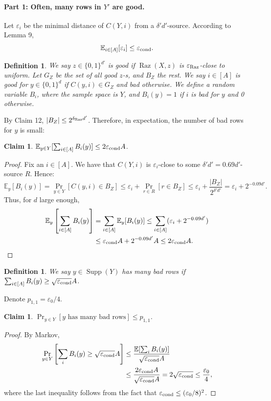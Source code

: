 \documentclass[10pt,a4paper]{article}
\newtheorem{definition}[theorem]{Definition}
\newtheorem{claim}[theorem]{Claim}
\DeclareMathOperator{\Supp}{Supp}
\DeclareMathOperator{\Raz}{Raz}
\newcommand{\E}{\mathbb E}
\begin{document}
\paragraph{Part 1: Often, many rows in $Y'$ are good.}
Let $\varepsilon_i$ be the minimal distance of $C(Y,i)$ from a $\delta'd'$-source. According to Lemma 9,
\[\E_{i\in[A]}[\varepsilon_i]\le\varepsilon_{\rm cond}.\]
\begin{definition}
We say $z\in\{0,1\}^{d'}$ is good if $\Raz(X,z)$ is $\varepsilon_{\rm Raz}$-close to uniform. Let $G_Z$ be the set of all good $z$-s, and $B_Z$ the rest. We say $i\in[A]$ is good for $y\in\{0,1\}^d$ if $C(y,i)\in G_Z$ and bad otherwise. We define a random variable $B_i$, where the sample space is $Y$, and $B_i(y)=1$ if $i$ is bad for $y$ and 0 otherwise.
\end{definition}
By Claim 12, $|B_Z|\le2^{\delta_{\rm Raz}d'}$. Therefore, in expectation, the number of bad rows for $y$ is small:
\begin{claim}$\E_{y\in Y}[\sum_{i\in[A]}B_i(y)]\le2\varepsilon_{\rm cond}A$.\end{claim}
\begin{proof}
Fix an $i\in[A]$. We have that $C(Y,i)$ is $\varepsilon_i$-close to some $\delta'd'=0.69d'$-source $R$. Hence:
\[\E_y[B_i(y)]=\Pr_{y\in Y}[C(y,i)\in B_Z]\le\varepsilon_i+\Pr_{r\in R}[r\in B_Z]\le\varepsilon_i+\frac{|B_Z|}{2^{\delta'd'}}=\varepsilon_i+2^{-0.09d'}.\]
Thus, for $d$ large enough,
\begin{align*}
\E_y\left[\sum_{i\in[A]}B_i(y)\right]&=\sum_{i\in[A]}\E_y[B_i(y)]\le\sum_{i\in[A]}(\varepsilon_i+2^{-0.09d'})\\
&\le\varepsilon_{\rm cond}A+2^{-0.09d'}A\le2\varepsilon_{\rm cond}A.
\end{align*}
\end{proof}
\begin{definition}
We say $y\in\Supp(Y)$ has many bad rows if $\sum_{i\in[A]}B_i(y)\ge\sqrt{\varepsilon_{\rm cond}}A$.
\end{definition}
Denote $p_{1,1}=\varepsilon_0/4$.
\begin{claim}$\Pr_{y\in Y}[y\text{ has many bad rows}]\le p_{1,1}$.\end{claim}
\begin{proof}
By Markov,
\begin{align*}
\Pr_{y\in Y}\left[\sum_iB_i(y)\ge\sqrt{\varepsilon_{\rm cond}}A\right]&\le\frac{\E[\sum_iB_i(y)]}{\sqrt{\varepsilon_{\rm cond}}A}\\
&\le\frac{2\varepsilon_{\rm cond}A}{\sqrt{\varepsilon_{\rm cond}}A}=2\sqrt{\varepsilon_{\rm cond}}\le\frac{\varepsilon_0}4,
\end{align*}
where the last inequality follows from the fact that $\varepsilon_{\rm cond}\le(\varepsilon_0/8)^2$.
\end{proof}
\end{document}
